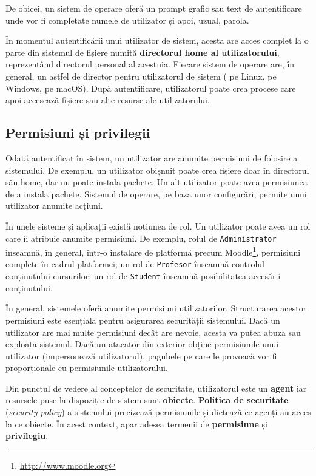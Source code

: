De obicei, un sistem de operare oferă un prompt grafic sau text de autentificare unde vor fi completate numele de utilizator și apoi, uzual, parola.

În momentul autentificării unui utilizator de sistem, acesta are acces complet la o parte din sistemul de fișiere numită \textbf{directorul home al utilizatorului}, reprezentând directorul personal al acestuia.
Fiecare sistem de operare are, în general, un astfel de director pentru utilizatorul de sistem ( pe Linux,  pe Windows,  pe macOS).
După autentificare, utilizatorul poate crea procese care apoi accesează fișiere sau alte resurse ale utilizatorului.

\subsection{Permisiuni și privilegii}
\label{sec:user:permissions}

Odată autentificat în sistem, un utilizator are anumite permisiuni de folosire a sistemului.
De exemplu, un utilizator obișnuit poate crea fișiere doar în directorul său home, dar nu poate instala pachete.
Un alt utilizator poate avea permisiunea de a instala pachete.
Sistemul de operare, pe baza unor configurări, permite unui utilizator anumite acțiuni.

În unele sisteme și aplicații există noțiunea de rol.
Un utilizator poate avea un rol care îi atribuie anumite permisiuni.
De exemplu, rolul de \texttt{Administrator} înseamnă, în general, într-o instalare de platformă precum Moodle\footnote{\url{http://www.moodle.org}}, permisiuni complete în cadrul platformei;
un rol de \texttt{Profesor} înseamnă controlul conținutului cursurilor;
un rol de \texttt{Student} înseamnă posibilitatea accesării conținutului.

În general, sistemele oferă anumite permisiuni utilizatorilor.
Structurarea acestor permisiuni este esențială pentru asigurarea securității sistemului.
Dacă un utilizator are mai multe permisiuni decât are nevoie, acesta va putea abuza sau exploata sistemul.
Dacă un atacator din exterior obține permisiunile unui utilizator (impersonează utilizatorul), pagubele pe care le provoacă vor fi proporționale cu permisiunile utilizatorului.

Din punctul de vedere al conceptelor de securitate, utilizatorul este un \textbf{agent} iar resursele puse la dispoziție de sistem sunt \textbf{obiecte}.
\textbf{Politica de securitate} (\textit{security policy}) a sistemului precizează permisiunile și dictează ce agenți au acces la ce obiecte.
În acest context, apar adesea termenii de \textbf{permisiune} și \textbf{privilegiu}.

